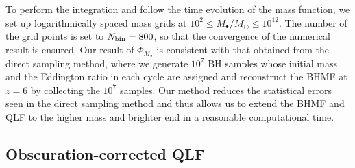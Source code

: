 \documentclass[twocolumn, twocolappendix]{aastex63}
\newcommand{\Msun}{M_\odot}
\newcommand{\Mbh}{M_\bullet}
\begin{document}
\begin{CJK*}{UTF8}{gbsn}
To perform the integration and follow the time evolution of the mass function, we set up 
logarithmically spaced mass grids at $10^2 \leq \Mbh /\Msun \leq 10^{12}$.
The number of the grid points is set to $N_{\rm bin}=800$, so that the convergence of the numerical result is ensured.
%
Our result of $\Phi_{\Mbh}$ is consistent with that obtained from the direct sampling method, where 
we generate $10^7$ BH samples whose initial mass and the Eddington ratio in each cycle are assigned
and reconstruct the BHMF at $z=6$ by collecting the $10^7$ samples.
Our method reduces the statistical errors seen in the direct sampling method 
and thus allows us to extend the BHMF and QLF to the higher mass and brighter end
in a reasonable computational time.







\vspace{2mm}
\subsection{Obscuration-corrected QLF}\label{sec:LF}


\end{CJK*}
\end{document}
